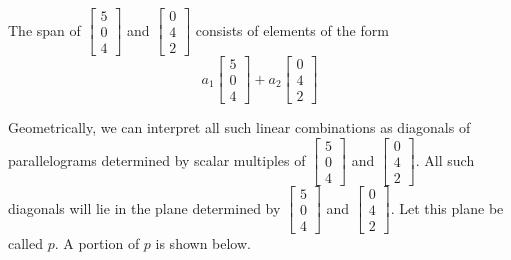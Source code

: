 \documentclass{ximera}
\begin{document}
\begin{example}
\begin{explanation}
The span of $\begin{bmatrix}5\\0\\4\end{bmatrix}$ and $\begin{bmatrix}0\\4\\2\end{bmatrix}$ consists of elements of the form
$$a_1\begin{bmatrix}5\\0\\4\end{bmatrix}+a_2\begin{bmatrix}0\\4\\2\end{bmatrix}$$

Geometrically, we can interpret all such linear combinations as diagonals of parallelograms determined by scalar multiples of $\begin{bmatrix}5\\0\\4\end{bmatrix}$ and $\begin{bmatrix}0\\4\\2\end{bmatrix}$.  All such diagonals will lie in the plane determined by $\begin{bmatrix}5\\0\\4\end{bmatrix}$ and $\begin{bmatrix}0\\4\\2\end{bmatrix}$.  Let this plane be called $p$.  A portion of $p$ is shown below.
\begin{center}
\end{center}


\end{explanation}
\end{example}
\end{document}
